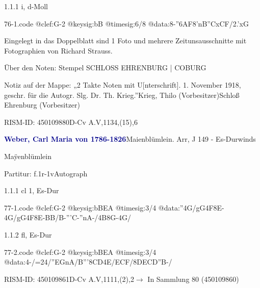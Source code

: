 \documentclass[a4paper, twocolumn, 11pt]{book}
\begin{document}
\par 1.1.1  i, d-Moll  
\begin{filecontents*}{76-1.code}
@clef:G-2
@keysig:bB
@timesig:6/8
@data:8-{''6AF8'nB}{''CxCF}/2.'xG
\end{filecontents*}
\newline %
\par Eingelegt in das Doppelblatt sind 1 Foto und mehrere Zeitunsausschnitte mit Fotographien von Richard Strauss.
\par Über den Noten: Stempel {\textquotedbl}SCHLOSS EHRENBURG | COBURG{\textquotedbl}
\par Notiz auf der Mappe: „2 Takte Noten mit U[nterschrift]. 1. November 1918, geschr. für die Autogr. Slg. Dr. Th. Krieg.”\newline Krieg, Thilo  (Vorbesitzer)\newline Schloß Ehrenburg  (Vorbesitzer)
\par RISM-ID: 450109880\newline D-Cv  A.V,1134,(15),6
\par \vspace{16pt} \textcolor{darkblue}{\textbf{Weber, Carl Maria von  1786-1826}}\hfillplus{[77]}\newline Maienblümlein. Arr, J 149 - Es-Dur\newline winds
\par \begin{itshape} Maÿenblümlein\end{itshape} 
\par \textcolor{darkblue}{}  Partitur: f.1r-1v\newline Autograph
\par 1.1.1  cl 1, Es-Dur  
\begin{filecontents*}{77-1.code}
@clef:G-2
@keysig:bBEA
@timesig:3/4
@data:''4G/gG4F8E-4G/gG4F8E-{BB}/B-'''C-''nA-/4B8G-4G/
\end{filecontents*}
\newline %
\par 1.1.2  fl, Es-Dur  
\begin{filecontents*}{77-2.code}
@clef:G-2
@keysig:bBEA
@timesig:3/4
@data:4-/=24/''EGnA/B'''{8CD}4E/ECF/{8DECD}''B-/
\end{filecontents*}
\newline %
\par RISM-ID: 450109861\newline D-Cv  A.V,1111,(2),2\newline $\rightarrow$ In Sammlung 80 (450109860)
      
\end{document}
